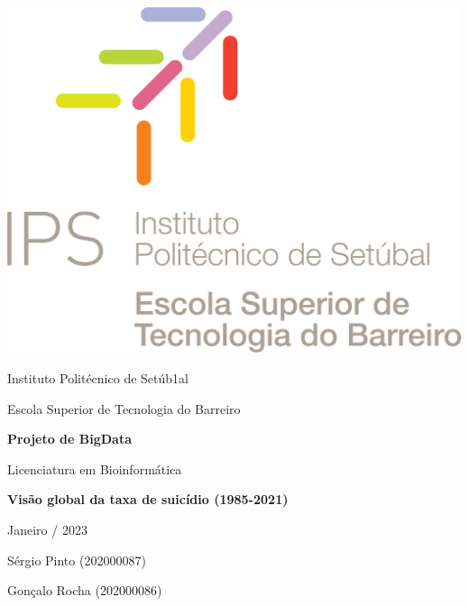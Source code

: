 \documentclass{article}
\begin{document}
\thispagestyle{empty}
\begin{flushleft}
\includegraphics[scale=0.15]{ESTB.jpg}
\end{flushleft}

\begin{center}
\Large{Instituto Politécnico de Setúb1al}
\end{center}

\begin{center}
\Large{Escola Superior de Tecnologia do Barreiro}
\end{center}

\medskip %


\begin{center}
\Large{\textbf{Projeto de BigData}}
\end{center}
\begin{center}
\Large{Licenciatura em Bioinformática}
\end{center}

\vspace{2cm} %

\begin{center}
\huge{\textbf{                                                     Visão global da taxa de suicídio 
\newline
(1985-2021)}} 
\end{center}

\vspace{7cm}
\begin{center}

\Large{Janeiro / 2023}


\large{Sérgio Pinto (202000087)}

\large{Gonçalo Rocha (202000086)}


\end{center}
\end{document}
